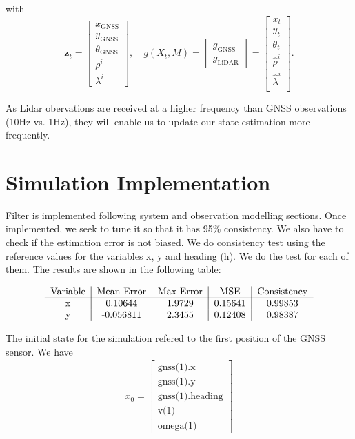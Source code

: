 \documentclass[conference]{IEEEtran}
\begin{document}
with
\[
\mathbf{z}_t =
\begin{bmatrix}
x_\text{GNSS} \\
y_\text{GNSS} \\
\theta_\text{GNSS} \\
\rho^{i} \\
\lambda^{i}
\end{bmatrix}, \quad
g(X_t, M) =
\begin{bmatrix}
g_\text{GNSS} \\
g_\text{LiDAR}
\end{bmatrix} = 
\begin{bmatrix}
x_t \\
y_t \\
\theta_t \\
\hat{\rho}^{i} \\
\hat{\lambda}^{i} \\
\end{bmatrix}.
\]

\vspace{3mm}

\noindent As Lidar obervations are received at a higher frequency than GNSS observations (10Hz vs. 1Hz), they will enable us to update our state estimation more frequently.

\section{Simulation Implementation}

Filter is implemented following system and observation modelling sections. Once implemented, we seek to tune it so that it has 95\% consistency. We also have to check if the estimation error is not biased. We do consistency test using the reference values for the variables x, y and heading (h). We do the test for each of them. The results are shown in the following table:

\begin{align*}
\begin{tabular}{c|c|c|c|c} 
  Variable & Mean Error & Max Error & MSE & Consistency \\ \hline 
  x & 0.10644 & 1.9729 & 0.15641 & 0.99853 \\
  y   & -0.056811 & 2.3455 &  0.12408 & 0.98387\\
\end{tabular}
\end{align*}


The initial state for the simulation refered to the first position of the GNSS sensor. We have \begin{align*}
   x_0 = \begin{bmatrix}
    \text{gnss(1).x} \\ 
    \text{gnss(1).y} \\
    \text{gnss(1).heading} \\
    \text{v(1)} \\
    \text{omega(1)}
    \end{bmatrix}
\end{align*}
\end{document}
